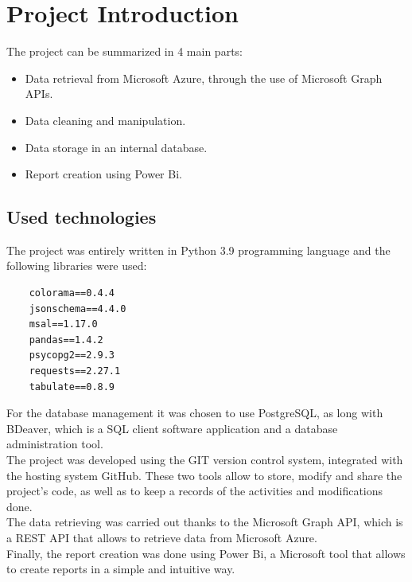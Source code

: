 \documentclass[12pt, a4paper, oneside]{article}
\begin{document}
\newpage
\section{Project Introduction}
The project can be summarized in 4 main parts:
\begin{itemize}
    \item Data retrieval from Microsoft Azure, through the use of Microsoft Graph APIs.
    \item Data cleaning and manipulation.
    \item Data storage in an internal database.
    \item Report creation using Power Bi.
\end{itemize}
\subsection{Used technologies}
The project was entirely written in Python 3.9 programming language and the following libraries were used:
\begin{verbatim}
    colorama==0.4.4
    jsonschema==4.4.0
    msal==1.17.0
    pandas==1.4.2   
    psycopg2==2.9.3
    requests==2.27.1
    tabulate==0.8.9
\end{verbatim}
For the database management it was chosen to use PostgreSQL, as long with BDeaver, which is a SQL client software application and a database administration tool.\\
The project was developed using the GIT version control system, integrated with the hosting system GitHub. These two tools allow to store, modify and share the project's code, as well as to keep a records
of the activities and modifications done.\\
The data retrieving was carried out thanks to the Microsoft Graph API, which is a REST API that allows to retrieve data from Microsoft Azure.\\
Finally, the report creation was done using Power Bi, a Microsoft tool that allows to create reports in a simple and intuitive way.

\newpage
\end{document}
